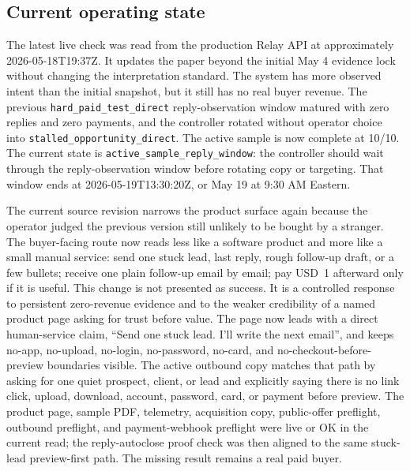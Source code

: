 \documentclass[12pt,letterpaper]{article}
\begin{document}
\subsection{Current operating state}

The latest live check was read from the production Relay API at approximately 2026-05-18T19:37Z. It updates the paper beyond the initial May 4 evidence lock without changing the interpretation standard. The system has more observed intent than the initial snapshot, but it still has no real buyer revenue. The previous \texttt{hard\_paid\_test\_direct} reply-observation window matured with zero replies and zero payments, and the controller rotated without operator choice into \texttt{stalled\_opportunity\_direct}. The active sample is now complete at 10/10. The current state is \texttt{active\_sample\_reply\_window}: the controller should wait through the reply-observation window before rotating copy or targeting. That window ends at 2026-05-19T13:30:20Z, or May 19 at 9:30 AM Eastern.

The current source revision narrows the product surface again because the operator judged the previous version still unlikely to be bought by a stranger. The buyer-facing route now reads less like a software product and more like a small manual service: send one stuck lead, last reply, rough follow-up draft, or a few bullets; receive one plain follow-up email by email; pay USD~1 afterward only if it is useful. This change is not presented as success. It is a controlled response to persistent zero-revenue evidence and to the weaker credibility of a named product page asking for trust before value. The page now leads with a direct human-service claim, \enquote{Send one stuck lead. I'll write the next email}, and keeps no-app, no-upload, no-login, no-password, no-card, and no-checkout-before-preview boundaries visible. The active outbound copy matches that path by asking for one quiet prospect, client, or lead and explicitly saying there is no link click, upload, download, account, password, card, or payment before preview. The product page, sample PDF, telemetry, acquisition copy, public-offer preflight, outbound preflight, and payment-webhook preflight were live or OK in the current read; the reply-autoclose proof check was then aligned to the same stuck-lead preview-first path. The missing result remains a real paid buyer.
\end{document}
